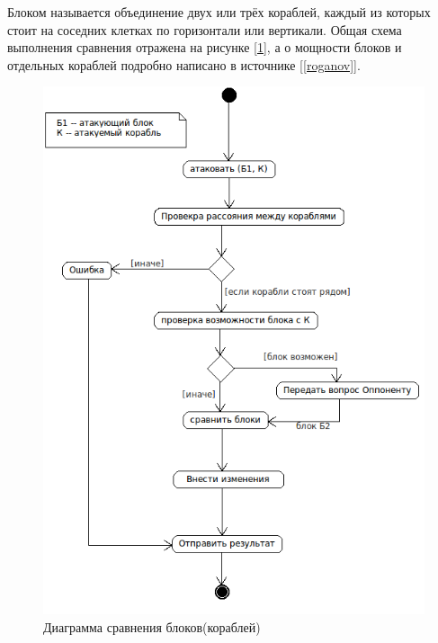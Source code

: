  Блоком называется объединение двух или трёх кораблей, каждый из которых стоит на соседних клетках по горизонтали или вертикали. Общая схема выполнения сравнения отражена на рисунке [\ref{fig18}], а о мощности блоков и отдельных кораблей подробно написано в источнике [\ref{roganov}].
\begin{figure}[htp]
\centering
\includegraphics[width=12cm]{images/ask.png}
\caption{Диаграмма сравнения блоков(кораблей)}
\label{fig18}
\end{figure}
\endinput
